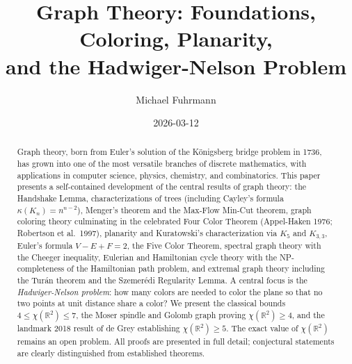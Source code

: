 \documentclass[12pt,a4paper]{amsart}
\theoremstyle{definition}
\theoremstyle{remark}
\newcommand{\R}{\mathbb{R}}
\newcommand{\chr}{\chi}
\begin{document}
\title{Graph Theory: Foundations, Coloring, Planarity,\\
       and the Hadwiger-Nelson Problem}

\author{Michael Fuhrmann}

\address{Specialist Mathematics Project, Build 145}


\date{2026-03-12}



\begin{abstract}
Graph theory, born from Euler's solution of the K\"{o}nigsberg bridge problem
in 1736, has grown into one of the most versatile branches of discrete
mathematics, with applications in computer science, physics, chemistry, and
combinatorics. This paper presents a self-contained development of the central
results of graph theory: the Handshake Lemma, characterizations of trees
(including Cayley's formula $\kappa(K_n) = n^{n-2}$), Menger's theorem and the
Max-Flow Min-Cut theorem, graph coloring theory culminating in the celebrated
Four Color Theorem (Appel-Haken 1976; Robertson et al.\ 1997), planarity and
Kuratowski's characterization via $K_5$ and $K_{3,3}$, Euler's formula
$V - E + F = 2$, the Five Color Theorem, spectral graph theory with the
Cheeger inequality, Eulerian and Hamiltonian cycle theory with the NP-completeness
of the Hamiltonian path problem, and extremal graph theory including the
Tur\'{a}n theorem and the Szemer\'{e}di Regularity Lemma. A central focus is the
\emph{Hadwiger-Nelson problem}: how many colors are needed to color the plane
so that no two points at unit distance share a color? We present the classical
bounds $4 \le \chr(\R^2) \le 7$, the Moser spindle and Golomb graph proving
$\chr(\R^2) \ge 4$, and the landmark 2018 result of de Grey establishing
$\chr(\R^2) \ge 5$. The exact value of $\chr(\R^2)$ remains an open problem.
All proofs are presented in full detail; conjectural statements are clearly
distinguished from established theorems.
\end{abstract}

\maketitle
\end{document}
